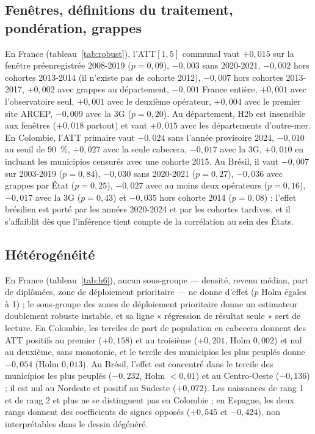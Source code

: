 \documentclass[11pt,a4paper]{article}
\begin{document}


\subsection{Fenêtres, définitions du traitement, pondération, grappes}

En France (tableau~\ref{tab:robust}), l'ATT$[1,5]$ communal vaut $+0{,}015$ sur la fenêtre préenregistrée 2008-2019 ($p = 0{,}09$), $-0{,}003$ sans 2020-2021, $-0{,}002$ hors cohortes 2013-2014 (il n'existe pas de cohorte 2012), $-0{,}007$ hors cohortes 2013-2017, $+0{,}002$ avec grappes au département, $-0{,}001$ France entière, $+0{,}001$ avec l'observatoire seul, $+0{,}001$ avec le deuxième opérateur, $+0{,}004$ avec le premier site ARCEP, $-0{,}009$ avec la 3G ($p = 0{,}20$). Au département, H2b est insensible aux fenêtres ($+0{,}018$ partout) et vaut $+0{,}015$ avec les départements d'outre-mer. En Colombie, l'ATT primaire vaut $-0{,}024$ sans l'année provisoire 2024, $-0{,}010$ au seuil de 90~\%, $+0{,}027$ avec la seule cabecera, $-0{,}017$ avec la 3G, $+0{,}010$ en incluant les municipios censurés avec une cohorte 2015. Au Brésil, il vaut $-0{,}007$ sur 2003-2019 ($p = 0{,}84$), $-0{,}030$ sans 2020-2021 ($p = 0{,}27$), $-0{,}036$ avec grappes par État ($p = 0{,}25$), $-0{,}027$ avec au moins deux opérateurs ($p = 0{,}16$), $-0{,}017$ avec la 3G ($p = 0{,}43$) et $-0{,}035$ hors cohorte 2014 ($p = 0{,}08$) : l'effet brésilien est porté par les années 2020-2024 et par les cohortes tardives, et il s'affaiblit dès que l'inférence tient compte de la corrélation au sein des États.



\subsection{Hétérogénéité}

En France (tableau~\ref{tab:h6}), aucun sous-groupe — densité, revenu médian, part de diplômées, zone de déploiement prioritaire — ne donne d'effet ($p$ Holm égales à 1) ; le sous-groupe des zones de déploiement prioritaire donne un estimateur doublement robuste instable, et sa ligne « régression de résultat seule » sert de lecture. En Colombie, les terciles de part de population en cabecera donnent des ATT positifs au premier ($+0{,}158$) et au troisième ($+0{,}201$, Holm $0{,}002$) et nul au deuxième, sans monotonie, et le tercile des municipios les plus peuplés donne $-0{,}054$ (Holm $0{,}013$). Au Brésil, l'effet est concentré dans le tercile des municípios les plus peuplés ($-0{,}232$, Holm $< 0{,}01$) et au Centro-Oeste ($-0{,}136$) ; il est nul au Nordeste et positif au Sudeste ($+0{,}072$). Les naissances de rang 1 et de rang 2 et plus ne se distinguent pas en Colombie ; en Espagne, les deux rangs donnent des coefficients de signes opposés ($+0{,}545$ et $-0{,}424$), non interprétables dans le dessin dégénéré.
\end{document}
